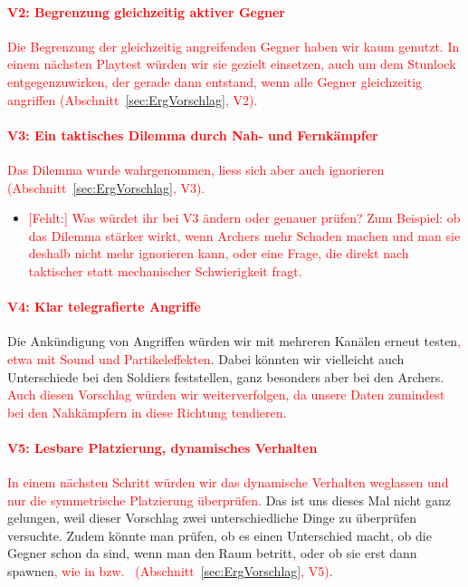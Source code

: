 \documentclass[../Main.tex]{subfiles}
\begin{document}
\paragraph{\textcolor{red}{V2: Begrenzung gleichzeitig aktiver Gegner}}
\textcolor{red}{Die Begrenzung der gleichzeitig angreifenden Gegner haben wir kaum genutzt. In einem nächsten Playtest würden wir sie gezielt einsetzen, auch um dem Stunlock entgegenzuwirken, der gerade dann entstand, wenn alle Gegner gleichzeitig angriffen (Abschnitt~\ref{sec:ErgVorschlag}, V2).}

\paragraph{\textcolor{red}{V3: Ein taktisches Dilemma durch Nah- und Fernkämpfer}}
\textcolor{red}{Das Dilemma wurde wahrgenommen, liess sich aber auch ignorieren (Abschnitt~\ref{sec:ErgVorschlag}, V3).}

\begin{itemize}[leftmargin=1.5cm]
    \item \textcolor{red}{[Fehlt:] Was würdet ihr bei V3 ändern oder genauer prüfen? Zum Beispiel: ob das Dilemma stärker wirkt, wenn Archers mehr Schaden machen und man sie deshalb nicht mehr ignorieren kann, oder eine Frage, die direkt nach taktischer statt mechanischer Schwierigkeit fragt.}
\end{itemize}

\paragraph{\textcolor{red}{V4: Klar telegrafierte Angriffe}}
Die Ankündigung von Angriffen würden wir mit mehreren Kanälen erneut testen\textcolor{red}{, etwa mit Sound und Partikeleffekten}. Dabei könnten wir vielleicht auch Unterschiede bei den Soldiers feststellen, ganz besonders aber bei den Archers. \textcolor{red}{Auch diesen Vorschlag würden wir weiterverfolgen, da unsere Daten zumindest bei den Nahkämpfern in diese Richtung tendieren.}

\paragraph{\textcolor{red}{V5: Lesbare Platzierung, dynamisches Verhalten}}
\textcolor{red}{In einem nächsten Schritt würden wir das dynamische Verhalten weglassen und nur die symmetrische Platzierung überprüfen.} Das ist uns dieses Mal nicht ganz gelungen, weil dieser Vorschlag zwei unterschiedliche Dinge zu überprüfen versuchte. Zudem könnte man prüfen, ob es einen Unterschied macht, ob die Gegner schon da sind, wenn man den Raum betritt, oder ob sie erst dann spawnen\textcolor{red}{, wie in  bzw.\  (Abschnitt~\ref{sec:ErgVorschlag}, V5)}.
\end{document}
